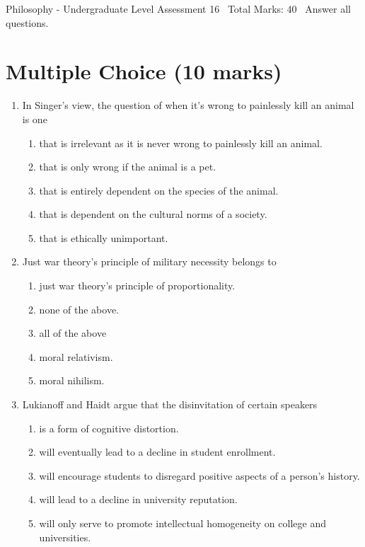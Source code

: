 \documentclass[12pt]{article}
\begin{document}
\begin{center}
Philosophy - Undergraduate Level Assessment 16 \
Total Marks: 40 \
Answer all questions.
\end{center}

\section*{Multiple Choice (10 marks)}
\begin{enumerate}[label=\arabic*.]
\item In Singer's view, the question of when it's wrong to painlessly kill an animal is one
\begin{enumerate}[label=(\alph*)]
    \item that is irrelevant as it is never wrong to painlessly kill an animal.
    \item that is only wrong if the animal is a pet.
    \item that is entirely dependent on the species of the animal.
    \item that is dependent on the cultural norms of a society.
    \item that is ethically unimportant.
\end{enumerate}
\item Just war theory's principle of military necessity belongs to
\begin{enumerate}[label=(\alph*)]
    \item just war theory's principle of proportionality.
    \item none of the above.
    \item all of the above
    \item moral relativism.
    \item moral nihilism.
\end{enumerate}
\item Lukianoff and Haidt argue that the disinvitation of certain speakers
\begin{enumerate}[label=(\alph*)]
    \item is a form of cognitive distortion.
    \item will eventually lead to a decline in student enrollment.
    \item will encourage students to disregard positive aspects of a person's history.
    \item will lead to a decline in university reputation.
    \item will only serve to promote intellectual homogeneity on college and universities.

\end{enumerate}
\end{enumerate}
\end{document}
